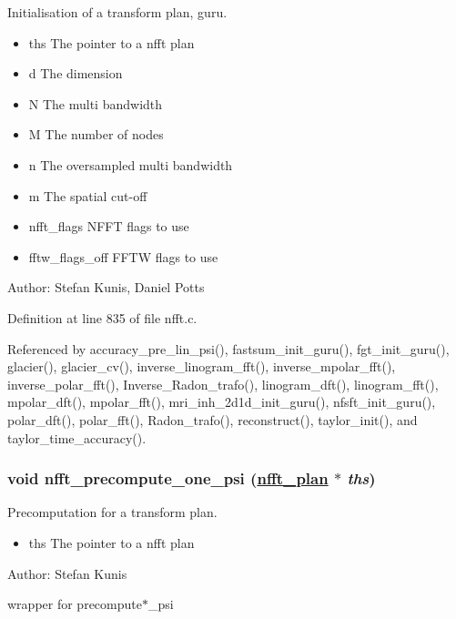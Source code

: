 Initialisation of a transform plan, guru. 

\begin{itemize}
\item ths The pointer to a nfft plan \item d The dimension \item N The multi bandwidth \item M The number of nodes \item n The oversampled multi bandwidth \item m The spatial cut-off \item nfft\_\-flags NFFT flags to use \item fftw\_\-flags\_\-off FFTW flags to use\end{itemize}
\begin{Desc}
\item[Author:]Stefan Kunis, Daniel Potts \end{Desc}


Definition at line 835 of file nfft.c.

Referenced by accuracy\_\-pre\_\-lin\_\-psi(), fastsum\_\-init\_\-guru(), fgt\_\-init\_\-guru(), glacier(), glacier\_\-cv(), inverse\_\-linogram\_\-fft(), inverse\_\-mpolar\_\-fft(), inverse\_\-polar\_\-fft(), Inverse\_\-Radon\_\-trafo(), linogram\_\-dft(), linogram\_\-fft(), mpolar\_\-dft(), mpolar\_\-fft(), mri\_\-inh\_\-2d1d\_\-init\_\-guru(), nfsft\_\-init\_\-guru(), polar\_\-dft(), polar\_\-fft(), Radon\_\-trafo(), reconstruct(), taylor\_\-init(), and taylor\_\-time\_\-accuracy().\hypertarget{group__nfft_ga10}{
\subsubsection[nfft\_\-precompute\_\-one\_\-psi]{\setlength{\rightskip}{0pt plus 5cm}void nfft\_\-precompute\_\-one\_\-psi (\hyperlink{structnfft__plan}{nfft\_\-plan} $\ast$ {\em ths})}}
\label{group__nfft_ga10}


Precomputation for a transform plan. 

\begin{itemize}
\item ths The pointer to a nfft plan\end{itemize}
\begin{Desc}
\item[Author:]Stefan Kunis\end{Desc}
wrapper for precompute$\ast$\_\-psi

